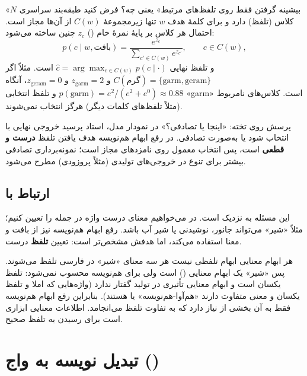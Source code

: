 \begin{addedbox}{«بیشینه گرفتن فقط روی تلفظ‌های مرتبط» یعنی چه؟}
فرض کنید طبقه‌بند سراسری $N$ کلاس (تلفظ) دارد و برای کلمهٔ هدف $w$ تنها زیرمجموعهٔ $C(w)$ از آن‌ها مجاز است. احتمال هر کلاس بر پایهٔ نمرهٔ خام () $z_c$ چنین ساخته می‌شود:
\[
p(c \mid w, \text{بافت}) = \frac{e^{z_c}}{\sum_{c' \in C(w)} e^{z_{c'}}}, \qquad c \in C(w),
\]
و تلفظ نهایی $\hat c = \arg\max_{c \in C(w)} p(c \mid \cdot)$ است. مثلاً اگر $C(\text{گرم}) = \{\text{garm},\text{geram}\}$ و $z_{\text{garm}} = 2$ و $z_{\text{geram}} = 0$، آنگاه $p(\text{garm}) = e^{2}/(e^{2}+e^{0}) \approx 0.88$ و تلفظ انتخابی «garm» است. کلاس‌های نامربوط (مثلاً تلفظ‌های کلمات دیگر) هرگز انتخاب نمی‌شوند.
\end{addedbox}

\begin{exambox}{پرسش روی تخته: «اینجا  یا تصادفی؟»}
در نمودار مدل، استاد پرسید خروجی نهایی با  انتخاب شود یا به‌صورت تصادفی. در رفع ابهام هم‌نویسه هدف یافتن تلفظ \textbf{درست و قطعی} است، پس انتخاب معمول  روی نامزدهای مجاز است؛ نمونه‌برداری تصادفی بیشتر برای تنوع در خروجی‌های تولیدی (مثلاً پروزودی) مطرح می‌شود.
\end{exambox}

\subsection{ارتباط با }
این مسئله به  نزدیک است. در  می‌خواهیم معنای درست واژه در جمله را تعیین کنیم؛ مثلاً «شیر» می‌تواند جانور، نوشیدنی یا شیر آب باشد. رفع ابهام هم‌نویسه نیز از بافت و معنا استفاده می‌کند، اما هدفش مشخص‌تر است: تعیین \textbf{تلفظ} درست.

\begin{correctionbox}{هر ابهام معنایی ابهام تلفظی نیست}
هر سه معنای «شیر» در فارسی \eng{[ʃiɾ]} تلفظ می‌شوند. پس «شیر» یک ابهام معنایی () است ولی برای  هم‌نویسه محسوب نمی‌شود: تلفظ یکسان است و ابهام معنایی تأثیری در تولید گفتار ندارد (واژه‌هایی که املا و تلفظ یکسان و معنی متفاوت دارند «هم‌آوا-هم‌نویسه» یا  هستند). بنابراین رفع ابهام هم‌نویسه فقط به آن بخشی از  نیاز دارد که به تفاوت تلفظ می‌انجامد. اطلاعات معنایی ابزاری است برای رسیدن به تلفظ صحیح.
\end{correctionbox}

\section{تبدیل نویسه به واج ()}

